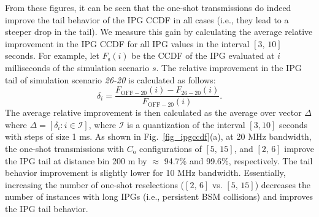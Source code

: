 \documentclass[conference]{IEEEtran}
\begin{document}
From these figures, it can be seen that the one-shot transmissions do indeed improve the tail behavior of the IPG CCDF in all cases (i.e., they lead to a steeper drop in the tail). We measure this gain by calculating the average relative improvement in the IPG CCDF for all IPG values in the interval $[3,\,10]$ seconds. For example, let $F_{\mathrm{s}}(i)$ be the CCDF of the IPG evaluated at $i$ milliseconds of the simulation scenario $s$. The relative improvement in the IPG tail of simulation scenario \textit{26-20} is calculated as follows:
\begin{equation}
    \delta_{i}=\frac{F_{\mathrm{OFF-20}}(i)-F_{\mathrm{26-20}}(i)}{F_{\mathrm{OFF-20}}(i)}.
\end{equation}
The average relative improvement is then calculated as the average over vector $\Delta$ where $\Delta=[\delta_{i}: i\in{\mathcal{I}}]$, where $\mathcal{I}$ is a quantization of the interval $[3,10]$ seconds with steps of size 1 ms. As shown in Fig.~\ref{fig_ipgccdf}(a), at 20 MHz bandwidth, the one-shot transmissions with $C_{\mathrm{o}}$ configurations of $[5,\,15]$, and $[2,\,6]$ improve the IPG tail at distance bin 200 m by $\approx$ 94.7$\%$ and 99.6$\%$, respectively. The tail behavior improvement is slightly lower for 10 MHz bandwidth. Essentially, increasing the number of one-shot reselections ($[2,\,6]$ vs. $[5,\,15]$) decreases the number of instances with long IPGs (i.e., persistent BSM collisions) and improves the IPG tail behavior. 
\end{document}
